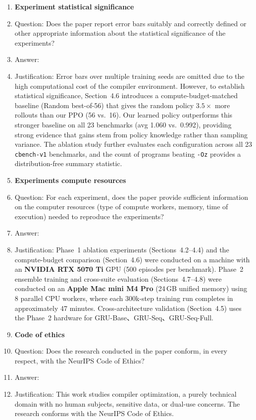 \begin{enumerate}
\item {\bf Experiment statistical significance}
    \item[] Question: Does the paper report error bars suitably and correctly defined or other appropriate information about the statistical significance of the experiments?
    \item[] Answer: \answerNo{}
    \item[] Justification: Error bars over multiple training seeds are omitted due to the high computational cost of the compiler environment. However, to establish statistical significance, Section~4.6 introduces a compute-budget-matched baseline (Random best-of-56) that gives the random policy $3.5\times$ more rollouts than our PPO (56 vs.\ 16). Our learned policy outperforms this stronger baseline on all 23 benchmarks (avg 1.060 vs.\ 0.992), providing strong evidence that gains stem from policy knowledge rather than sampling variance. The ablation study further evaluates each configuration across all 23 \texttt{cbench-v1} benchmarks, and the count of programs beating \texttt{-Oz} provides a distribution-free summary statistic.

\item {\bf Experiments compute resources}
    \item[] Question: For each experiment, does the paper provide sufficient information on the computer resources (type of compute workers, memory, time of execution) needed to reproduce the experiments?
    \item[] Answer: \answerYes{}
    \item[] Justification: Phase~1 ablation experiments (Sections~4.2--4.4) and the compute-budget comparison (Section~4.6) were conducted on a machine with an \textbf{NVIDIA RTX 5070 Ti} GPU (500 episodes per benchmark). Phase~2 ensemble training and cross-suite evaluation (Sections~4.7--4.8) were conducted on an \textbf{Apple Mac mini M4 Pro} (24\,GB unified memory) using 8 parallel CPU workers, where each 300k-step training run completes in approximately 47 minutes. Cross-architecture validation (Section~4.5) uses the Phase~2 hardware for GRU-Base、GRU-Seq、GRU-Seq-Full.

\item {\bf Code of ethics}
    \item[] Question: Does the research conducted in the paper conform, in every respect, with the NeurIPS Code of Ethics?
    \item[] Answer: \answerYes{}
    \item[] Justification: This work studies compiler optimization, a purely technical domain with no human subjects, sensitive data, or dual-use concerns. The research conforms with the NeurIPS Code of Ethics.


\end{enumerate}
